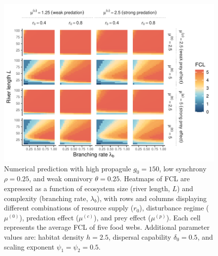 \begin{figure}
\centering
\includegraphics{../data_fmt/fig_rho025_g150_theta025.pdf}
\caption{Numerical prediction with high propagule \(g_0 = 150\), low
synchrony \(\rho = 0.25\), and weak omnivory \(\theta = 0.25\). Heatmaps
of FCL are expressed as a function of ecosystem size (river length,
\(L\)) and complexity (branching rate, \(\lambda_b\)), with rows and
columns displaying different combinations of resource supply (\(r_0\)),
disturbance regime (\(\mu^{(0)}\)), predation effect (\(\mu^{(c)}\)),
and prey effect (\(\mu^{(p)}\)). Each cell represents the average FCL of
five food webs. Additional parameter values are: habitat density
\(h=2.5\), dispersal capability \(\delta_0=0.5\), and scaling exponent
\(\psi_1=\psi_2=0.5\).\label{fig:fig-num2}}
\end{figure}

\newpage

